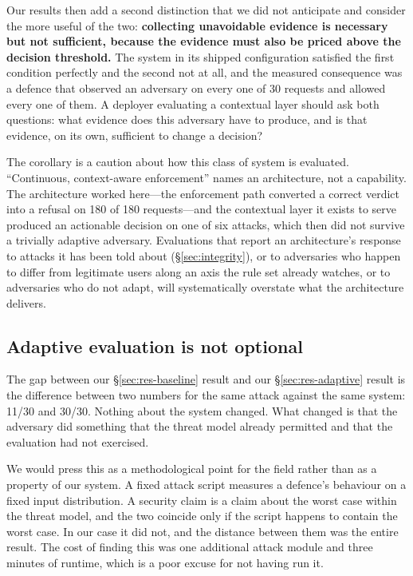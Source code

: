 Our results then add a second distinction that we did not anticipate and consider the more useful of the two: \textbf{collecting unavoidable evidence is necessary but not sufficient, because the evidence must also be priced above the decision threshold.} The system in its shipped configuration satisfied the first condition perfectly and the second not at all, and the measured consequence was a defence that observed an adversary on every one of 30 requests and allowed every one of them. A deployer evaluating a contextual layer should ask both questions: what evidence does this adversary have to produce, and is that evidence, on its own, sufficient to change a decision?

The corollary is a caution about how this class of system is evaluated. ``Continuous, context-aware enforcement'' names an architecture, not a capability. The architecture worked here---the enforcement path converted a correct verdict into a refusal on 180 of 180 requests---and the contextual layer it exists to serve produced an actionable decision on one of six attacks, which then did not survive a trivially adaptive adversary. Evaluations that report an architecture's response to attacks it has been told about (\S\ref{sec:integrity}), or to adversaries who happen to differ from legitimate users along an axis the rule set already watches, or to adversaries who do not adapt, will systematically overstate what the architecture delivers.

\subsection{Adaptive evaluation is not optional}

The gap between our \S\ref{sec:res-baseline} result and our \S\ref{sec:res-adaptive} result is the difference between two numbers for the same attack against the same system: 11/30 and 30/30. Nothing about the system changed. What changed is that the adversary did something that the threat model already permitted and that the evaluation had not exercised.

We would press this as a methodological point for the field rather than as a property of our system. A fixed attack script measures a defence's behaviour on a fixed input distribution. A security claim is a claim about the worst case within the threat model, and the two coincide only if the script happens to contain the worst case. In our case it did not, and the distance between them was the entire result. The cost of finding this was one additional attack module and three minutes of runtime, which is a poor excuse for not having run it.

